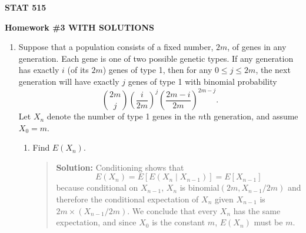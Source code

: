 \documentclass{article}
\begin{document}
\begin{center}
{\bf STAT 515}

{\bf Homework \#3 WITH SOLUTIONS}
\end{center}

\begin{enumerate}

  \item Suppose that a population consists of a fixed number, $2m$, of genes in
  any generation. Each gene is one of two possible genetic types. If any
  generation has exactly $i$ (of its $2m$) genes of type 1, then for any $0\le
  j\le 2m$, the next generation will have exactly $j$ genes of type 1 with
  binomial probability 
  \[ 
  {{2m}\choose j} \left( \frac{i}{2m} \right)^j \left( \frac{2m-i}{2m}
  \right)^{2m-j}.  
  \]
  Let $X_n$ denote the number of type 1 genes in the $n$th generation, 
  and assume $X_0=m$.

  \begin{enumerate}

    \item Find $E(X_n)$.
    \begin{quotation}{\bf Solution:}
    Conditioning shows that
    \[
    E(X_n) = E[ E(X_n \mid X_{n-1})] = E[X_{n-1}]
    \]
    because conditional on $X_{n-1}$, $X_n$ is binomial$(2m, X_{n-1}/2m)$
    and therefore the conditional expectation of $X_n$ given $X_{n-1}$ is
    $2m\times (X_{n-1}/2m)$.  We conclude that every $X_n$ has the same expectation,
    and since $X_0$ is the constant $m$, $E(X_n)$ must be $m$.
    \end{quotation}
    

\end{enumerate}
\end{enumerate}
\end{document}
